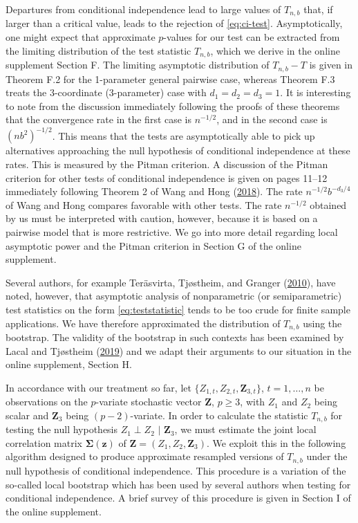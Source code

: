 \documentclass[
  12pt,
  letterpaper]{article}
\newcommand{\Z}{\bm{Z}}
\newcommand{\z}{\bm{z}}
\newcommand{\fSigma}{\bm{\Sigma}}
\theoremstyle{definition}
\theoremstyle{definition}
\theoremstyle{definition}
\theoremstyle{remark}
\begin{document}
Departures from conditional independence lead to large values of \(T_{n,b}\) that, if larger than a critical value, leads to the rejection of \eqref{eq:ci-test}. Asymptotically, one might expect that approximate \(p\)-values for our test can be extracted from the limiting distribution of the test statistic \(T_{n,b}\), which we derive in the online supplement Section F. The limiting asymptotic distribution of \(T_{n,b}-T\) is given in Theorem F.2 for the 1-parameter general pairwise case, whereas Theorem F.3 treats the 3-coordinate (3-parameter) case with \(d_1=d_2=d_3=1\). It is interesting to note from the discussion immediately following the proofs of these theorems that the convergence rate in the first case is \(n^{-1/2}\), and in the second case is \(\left(nb^2\right)^{-1/2}\). This means that the tests are asymptotically able to pick up alternatives approaching the null hypothesis of conditional independence at these rates. This is measured by the Pitman criterion. A discussion of the Pitman criterion for other tests of conditional independence is given on pages 11--12 immediately following Theorem 2 of Wang and Hong (\protect\hyperlink{ref-wang2017characteristic}{2018}). The rate \(n^{-1/2}b^{-d_3/4}\) of Wang and Hong compares favorable with other tests. The rate \(n^{-1/2}\) obtained by us must be interpreted with caution, however, because it is based on a pairwise model that is more restrictive. We go into more detail regarding local asymptotic power and the Pitman criterion in Section G of the online supplement.

Several authors, for example Teräsvirta, Tjøstheim, and Granger (\protect\hyperlink{ref-terasvirta2010modelling}{2010}), have noted, however, that asymptotic analysis of nonparametric (or semiparametric) test statistics on the form \eqref{eq:teststatistic} tends to be too crude for finite sample applications. We have therefore approximated the distribution of \(T_{n,b}\) using the bootstrap. The validity of the bootstrap in such contexts has been examined by Lacal and Tjøstheim (\protect\hyperlink{ref-lacal2018estimating}{2019}) and we adapt their arguments to our situation in the online supplement, Section H.

In accordance with our treatment so far, let \(\{Z_{1,t}, Z_{2, t}, \Z_{3, t}\}\), \(t = 1,\ldots,n\) be observations on the \(p\)-variate stochastic vector \(\Z\), \(p\geq3\), with \(Z_1\) and \(Z_2\) being scalar and \(\Z_3\) being \((p-2)\)-variate. In order to calculate the statistic \(T_{n,b}\) for testing the null hypothesis \(Z_1 \perp Z_2 \,\,|\,\, \Z_3\), we must estimate the joint local correlation matrix \(\fSigma(\z)\) of \(\Z = (Z_1, Z_2, \Z_3)\). We exploit this in the following algorithm designed to produce approximate resampled versions of \(T_{n,b}\) under the null hypothesis of conditional independence. This procedure is a variation of the so-called local bootstrap which has been used by several authors when testing for conditional independence. A brief survey of this procedure is given in Section I of the online supplement.
\end{document}
